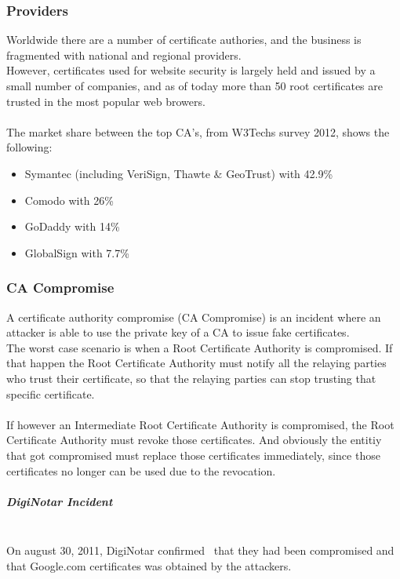 \subsubsection{Providers}
Worldwide there are a number of certificate authories, and the business is fragmented with national and regional providers.\\
However, certificates used for website security is largely held and issued by a small number of companies, and as of today more than 50 root certificates are trusted in the most popular web browers.\\\\
The market share between the top CA's, from W3Techs survey 2012, shows the following:
\begin{itemize}
	\item{Symantec (including VeriSign, Thawte \& GeoTrust) with 42.9\%}
	\item{Comodo with 26\%}
	\item{GoDaddy with 14\%}
	\item{GlobalSign with 7.7\%}
\end{itemize}

\subsubsection{CA Compromise}
A certificate authority compromise (CA Compromise) is an incident where an attacker is able to use the private key of a CA to issue fake certificates.\\
The worst case scenario is when a Root Certificate Authority is compromised. If that happen the Root Certificate Authority must notify all the relaying parties who trust their certificate, so that the relaying parties can stop trusting that specific certificate.\\\\
If however an Intermediate Root Certificate Authority is compromised, the Root Certificate Authority must revoke those certificates. And obviously the entitiy that got compromised must replace those certificates immediately, since those certificates no longer can be used due to the revocation.

\subparagraph{DigiNotar Incident}~\\
On august 30, 2011, DigiNotar confirmed~\cite{diginotarIncident} that they had been compromised and that Google.com certificates was obtained by the attackers.\\

